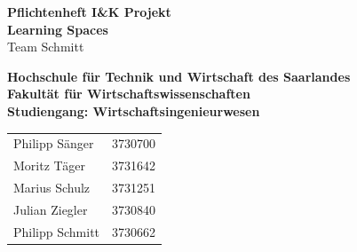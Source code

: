 \documentclass[a4paper,12pt]{article}
\begin{document}
\begin{titlepage}															%

\vfill

\begin{center}
	{\textbf{\LARGE{Pflichtenheft I\&K Projekt\\ {\flqq Learning Spaces\frqq}}}}\\
	Team Schmitt
\end{center}

\vfill
\textbf{Hochschule für Technik und Wirtschaft des Saarlandes}\\
\textbf{Fakultät für Wirtschaftswissenschaften}\\
\textbf{Studiengang: Wirtschaftsingenieurwesen}\\
\vfill

\begin{tabular}{lc}
Philipp Sänger & 3730700 \\
Moritz Täger & 3731642 \\
Marius Schulz & 3731251 \\
Julian Ziegler & 3730840 \\
Philipp Schmitt & 3730662 \\
\end{tabular}\\

\end{titlepage}																%

\thispagestyle{empty}
\newpage 																	%

\renewcommand{\thesection}{\Roman{section}}


\tableofcontents
\pagestyle{plain}
\clearpage

\setcounter{section}{0}
\renewcommand{\thesection}{\arabic{section}}
\end{document}
